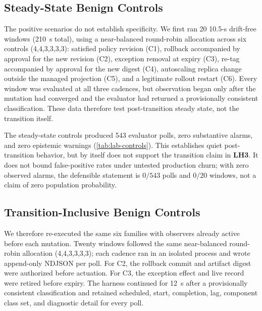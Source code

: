 \subsection{Steady-State Benign Controls}
The positive scenarios do not establish specificity. We first ran 20
10.5-s drift-free windows (210~s total), using a near-balanced round-robin
allocation across six controls (4,4,3,3,3,3):
satisfied policy revision (C1), rollback accompanied by approval for the new
revision (C2), exception removal at expiry (C3), re-tag accompanied by
approval for the new digest (C4), autoscaling replica change outside the
managed projection (C5), and a legitimate rollout restart (C6). Every window
was evaluated at all three cadences, but observation began only after the
mutation had converged and the evaluator had returned a provisionally
consistent classification. These data
therefore test post-transition steady state, not the transition itself.

\begin{table}[t]
\centering
\caption{Benign Live-Stack Controls. ``Polls'' Sums All Three Cadences;
Alarm Windows Counts Windows with at Least One Substantive Drift Verdict;
Epistemic Polls Count Honest \textnormal{\emph{Undecidable}} Outputs Separately.}
\label{tab:lab-controls}
\footnotesize
\resizebox{\columnwidth}{!}{}
\end{table}

The steady-state controls produced 543 evaluator polls, zero substantive alarms, and zero
epistemic warnings
(\cref{tab:lab-controls}). This establishes quiet post-transition behavior,
but by itself does not support the transition claim in \textbf{LH3}.
It does not bound false-positive rates under untested production churn; with
zero observed alarms, the defensible statement is $0/543$ polls and $0/20$
windows, not a claim of zero population probability.

\subsection{Transition-Inclusive Benign Controls}
We therefore re-executed the same six families with observers already active
before each mutation. Twenty windows followed the same near-balanced
round-robin allocation (4,4,3,3,3,3); each cadence
ran in an isolated process and wrote append-only NDJSON per poll. For C2, the
rollback commit and artifact digest were authorized before actuation. For C3,
the exception effect and live record were retired before expiry. The harness
continued for 12~s after a provisionally consistent classification and retained scheduled, start, completion,
lag, component class set, and diagnostic detail for every poll.

